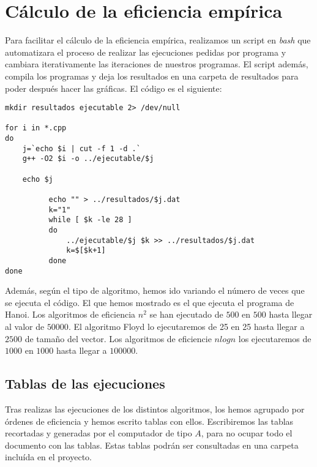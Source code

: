 \documentclass[a4paper, 11pt]{article}
\begin{document}
\section{Cálculo de la eficiencia empírica}
Para facilitar el cálculo de la eficiencia empírica, realizamos un script en \emph{bash} que automatizara el proceso de realizar las ejecuciones pedidas por programa y cambiara iterativamente las iteraciones de nuestros programas. El script además, compila los programas y deja los resultados en una carpeta de resultados para poder después hacer las gráficas. El código es el siguiente:

\begin{lstlisting}
mkdir resultados ejecutable 2> /dev/null

for i in *.cpp
do
    j=`echo $i | cut -f 1 -d .`
    g++ -O2 $i -o ../ejecutable/$j

    echo $j

	      echo "" > ../resultados/$j.dat
	      k="1"
	      while [ $k -le 28 ]
	      do
	          ../ejecutable/$j $k >> ../resultados/$j.dat
	          k=$[$k+1]
	      done
done

\end{lstlisting}
Además, según el tipo de algoritmo, hemos ido variando el número de veces que se ejecuta el código. El que hemos mostrado es el que ejecuta el programa de Hanoi. Los algoritmos de eficiencia $n^2$ se han ejecutado de $500$ en $500$ hasta llegar al valor de $50000$.  El algoritmo Floyd lo ejecutaremos de 25 en 25 hasta llegar a $2500$ de tamaño del vector.  Los algoritmos de eficiencie $nlogn$ los ejecutaremos de $1000$ en $1000$ hasta llegar a $100000$.

\subsection{Tablas de las ejecuciones}
Tras realizas las ejecuciones de los distintos algoritmos, los hemos agrupado por órdenes de eficiencia y hemos escrito tablas con ellos. Escribiremos  las tablas recortadas y generadas por el computador de tipo $A$, para no ocupar todo el documento con las tablas. Estas tablas podrán ser consultadas en una carpeta incluída en el proyecto.
\end{document}
